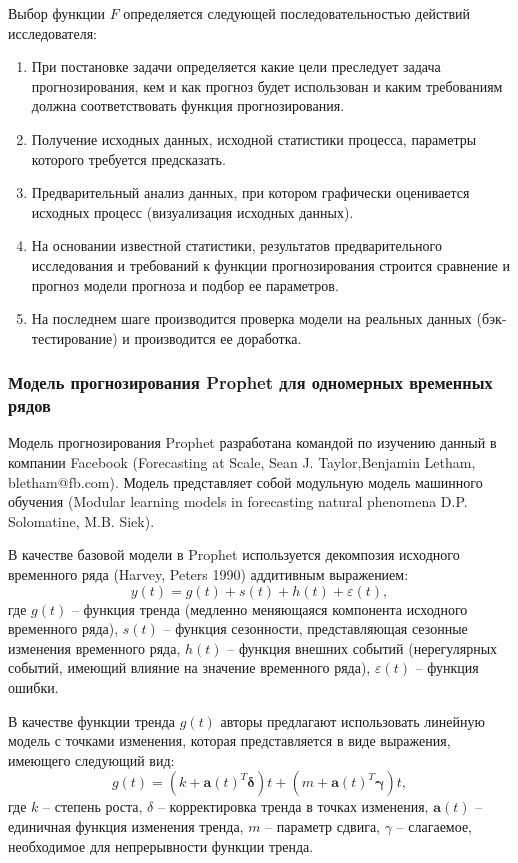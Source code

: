 Выбор функции $F$ определяется следующей последовательностью действий исследователя:
\begin{enumerate}
    \item При постановке задачи определяется какие цели преследует задача прогнозирования, кем и как прогноз будет 
    использован и каким требованиям должна соответствовать функция прогнозирования.
    \item Получение исходных данных, исходной статистики процесса, параметры которого требуется предсказать.
    \item Предварительный анализ данных, при котором графически оценивается исходных процесс (визуализация исходных 
    данных).
    \item На основании известной статистики, результатов предварительного исследования и требований к функции
    прогнозирования строится сравнение и прогноз модели прогноза и подбор ее параметров.
    \item На последнем шаге производится проверка модели на реальных данных (бэк-тестирование) и производится ее
    доработка.
\end{enumerate}

\subsubsection{Модель прогнозирования Prophet для одномерных временных рядов}

Модель прогнозирования Prophet разработана командой по изучению данный в компании Facebook 
(Forecasting at Scale, Sean J. Taylor,Benjamin Letham, bletham@fb.com). 
Модель представляет собой модульную модель машинного обучения (Modular learning models in forecasting natural phenomena
D.P. Solomatine, M.B. Siek).

В качестве базовой модели в Prophet используется декомпозия исходного временного ряда (Harvey, Peters 1990) аддитивным
выражением:
\begin{equation}
    y(t) = g(t) + s(t) + h(t) + \varepsilon(t),
\end{equation}
где $g(t)$ -- функция тренда (медленно меняющаяся компонента исходного временного ряда), $s(t)$ -- функция сезонности,
представляющая сезонные изменения временного ряда, $h(t)$ -- функция внешних событий (нерегулярных событий, имеющий влияние
на значение временного ряда), $\varepsilon(t)$ -- функция ошибки.

В качестве функции тренда $g(t)$ авторы предлагают использовать линейную модель с точками изменения, которая 
представляется в виде выражения, имеющего следующий вид:
\begin{equation}
    g(t) = \left( k + \mathbf{a}(t)^T \mathbf{\delta} \right)t + \left( m + \mathbf{a}(t)^T \mathbf{\gamma} \right)t,
\end{equation}
где $k$ -- степень роста, $\delta$ -- корректировка тренда в точках изменения, $\mathbf{a}(t)$ -- единичная функция 
изменения тренда, $m$ -- параметр сдвига, $\gamma$ -- слагаемое, необходимое для непрерывности функции тренда.

